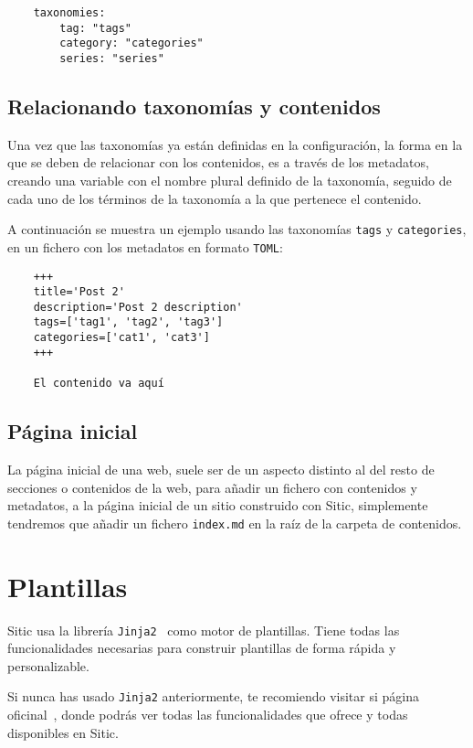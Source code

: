 \begin{verbatim}
    taxonomies:
        tag: "tags"
        category: "categories"
        series: "series"
\end{verbatim}

\subsection{Relacionando taxonomías y contenidos}

Una vez que las taxonomías ya están definidas en la configuración, la forma en la que se deben de relacionar
con los contenidos, es a través de los metadatos, creando una variable con el nombre plural definido de la
taxonomía, seguido de cada uno de los términos de la taxonomía a la que pertenece el contenido.

A continuación se muestra un ejemplo usando las taxonomías \texttt{tags} y \texttt{categories}, en un fichero
con los metadatos en formato \texttt{TOML}:

\begin{verbatim}
    +++
    title='Post 2'
    description='Post 2 description'
    tags=['tag1', 'tag2', 'tag3']
    categories=['cat1', 'cat3']
    +++

    El contenido va aquí
\end{verbatim}


\subsection{Página inicial}

La página inicial de una web, suele ser de un aspecto distinto al del resto de secciones o contenidos
de la web, para añadir un fichero con contenidos y metadatos, a la página inicial de un sitio
construido con Sitic, simplemente tendremos que añadir un fichero \texttt{index.md} en la raíz de
la carpeta de contenidos.


\section{Plantillas}

Sitic usa la librería \texttt{Jinja2}~\cite{jinja} como motor de plantillas. Tiene todas las funcionalidades
necesarias para construir plantillas de forma rápida y personalizable.

Si nunca has usado \texttt{Jinja2} anteriormente, te recomiendo visitar si página oficinal~\cite{jinja},
donde podrás ver todas las funcionalidades que ofrece y todas disponibles en Sitic.

